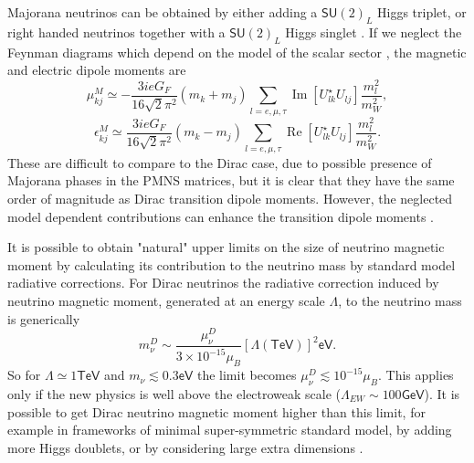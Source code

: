Majorana neutrinos can be obtained by either adding a $\textsf{SU}\left(2\right)_L$ Higgs triplet, or right handed neutrinos together with a $\textsf{SU}\left(2\right)_L$ Higgs singlet . If we neglect the Feynman diagrams which depend on the model of the scalar sector , the magnetic and electric dipole moments are
\begin{equation}
\mu_{kj}^M\simeq -\frac{3ieG_F}{16\sqrt{2}\pi^2}\left(m_k+m_j\right)\sum_{l=e,\mu ,\tau}\operatorname{Im}\left[U^{\star}_{lk}U_{lj}\right]\frac{m_l^2}{m_W^2},
\end{equation}
\begin{equation}
\epsilon_{kj}^M\simeq \frac{3ieG_F}{16\sqrt{2}\pi^2}\left(m_k-m_j\right)\sum_{l=e,\mu ,\tau}\operatorname{Re}\left[U^{\star}_{lk}U_{lj}\right]\frac{m_l^2}{m_W^2}.
\end{equation}
These are difficult to compare to the Dirac case, due to possible presence of Majorana phases in the PMNS matrices, but it is clear that they have the same order of magnitude as Dirac transition dipole moments. However, the neglected model dependent contributions can enhance the transition dipole moments \cite{nuElmagInt2015.pdf}. 

It is possible \cite{nuMMMajoranaBounds2006.pdf} to obtain "natural" upper limits on the size of neutrino magnetic moment by calculating its contribution to the neutrino mass by standard model radiative corrections. For Dirac neutrinos the radiative correction induced by neutrino magnetic moment, generated at an energy scale $\Lambda$, to the neutrino mass is generically
\begin{equation}
m_{\nu}^D\sim\frac{\mu_{\nu}^D}{3\times 10^{-15}\mu_B}\left[\Lambda\left(\textsf{TeV}\right)\right]^2\textsf{eV}.
\end{equation}
So for $\Lambda\simeq 1\textsf{TeV}$ and $m_{\nu}\lesssim 0.3\textsf{eV}$ the limit becomes $\mu_{\nu}^D\lesssim 10^{-15}\mu_B$. This applies only if the new physics is well above the electroweak scale ($\Lambda_{EW} \sim 100\textsf{GeV}$). It is possible to get Dirac neutrino magnetic moment higher than this limit, for example in frameworks of minimal super-symmetric standard model, by adding more Higgs doublets, or by considering large extra dimensions \cite{nuElmagInt2015.pdf}.

